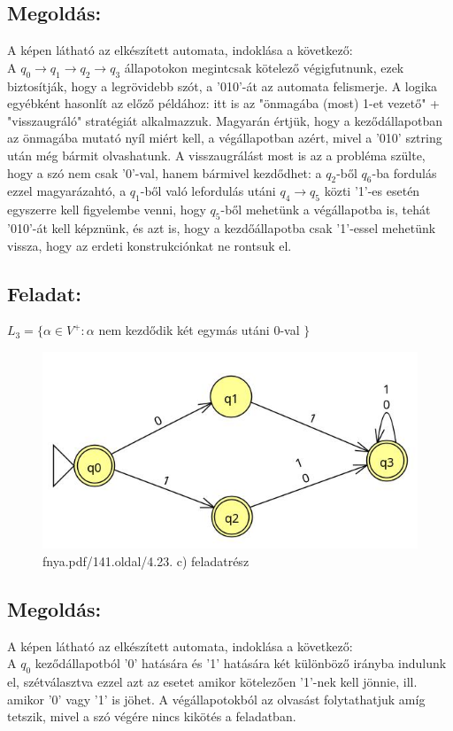 \documentclass[12pt]{article}
\begin{document}
\subsection{Megoldás:}
A képen látható az elkészített automata, indoklása a következő: \\
A $q_0 \rightarrow q_1 \rightarrow q_2 \rightarrow q_3$ állapotokon megintcsak kötelező végigfutnunk, ezek
biztosítják, hogy a legrövidebb szót, a '010'-át az automata felismerje. A logika egyébként hasonlít az előző 
példához: itt is az "önmagába (most) 1-et vezető" + "visszaugráló" stratégiát alkalmazzuk. Magyarán értjük, hogy
a keződállapotban az önmagába mutató nyíl miért kell, a végállapotban azért, mivel a '010' sztring után még
bármit olvashatunk. A visszaugrálást most is az a probléma szülte, hogy a szó nem csak '0'-val, hanem bármivel 
kezdődhet: a $q_2$-ből $q_6$-ba fordulás ezzel magyarázahtó, a $q_1$-ből való lefordulás utáni 
$q_4 \rightarrow q_5$ közti '1'-es esetén egyszerre kell figyelembe venni, hogy $q_5$-ből mehetünk a 
végállapotba is, tehát '010'-át kell képznünk, és azt is, hogy a kezdőállapotba csak '1'-essel mehetünk vissza,
hogy az erdeti konstrukciónkat ne rontsuk el.
\subsection{Feladat:}
$ L_3 = \{ \alpha \in V^+ : \alpha $ nem kezdődik két egymás utáni 0-val $\}$
\begin{figure}[h]
  \centering
  \includegraphics[width=0.7\linewidth]{img/c.jpg} 
  \caption{fnya.pdf/141.oldal/4.23. c) feladatrész}
  \label{fig:your_label}
\end{figure}
\subsection{Megoldás:}
A képen látható az elkészített automata, indoklása a következő: \\
A $q_0$ keződállapotból '0' hatására és '1' hatására két különböző irányba indulunk el, szétválasztva ezzel
azt az esetet amikor kötelezően '1'-nek kell jönnie, ill. amikor '0' vagy '1' is jöhet. A végállapotokból az 
olvasást folytathatjuk amíg tetszik, mivel a szó végére nincs kikötés a feladatban.
\end{document}
